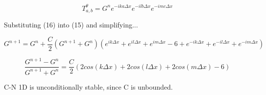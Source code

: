 \documentclass[a4paper,12pt]{article}
\begin{document}
\begin{equation}
T_{a,b}^{\theta} = G^n e^{-ika\Delta x}e^{-ilb\Delta x}e^{-imc\Delta x}
\end{equation}

Substituting (16) into (15) and simplifying...

\[
G^{n+1} = G^n + \frac{C}{2} \left(G^{n+1} + G^n \right)
\left(
e^{ik\Delta x} + e^{il\Delta x} +e^{im\Delta x} - 6
+ e^{-ik\Delta x} + e^{-il\Delta x} + e^{-im\Delta x}
\right)
\]

\[
\frac{G^{n+1}-G^n}{G^{n+1}+G^n} = \frac{C}{2}
\left(
2cos(k \Delta x) + 2cos(l \Delta x) + 2cos(m \Delta x) - 6
\right)
\]

C-N 1D is unconditionally stable, since C is unbounded.
\end{document}
